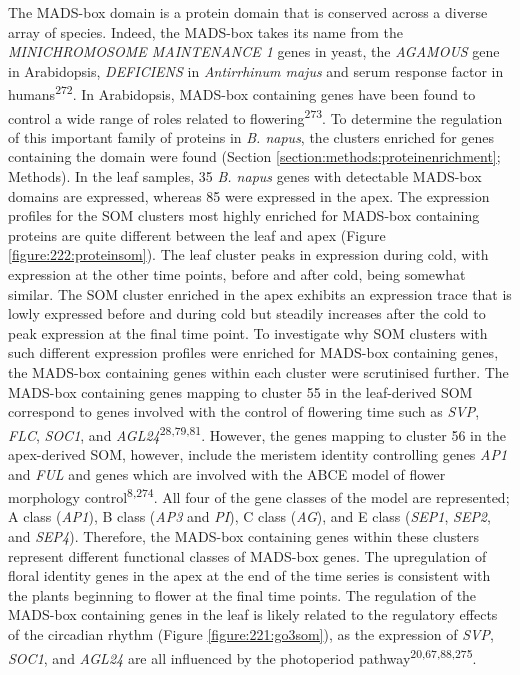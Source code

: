 \documentclass[12pt,]{book}
\begin{document}
The MADS-box domain is a protein domain that is conserved across a
diverse array of species. Indeed, the MADS-box takes its name from the
\emph{MINICHROMOSOME MAINTENANCE 1} genes in yeast, the \emph{AGAMOUS}
gene in Arabidopsis, \emph{DEFICIENS} in \emph{Antirrhinum majus} and
serum response factor in humans\textsuperscript{272}. In Arabidopsis,
MADS-box containing genes have been found to control a wide range of
roles related to flowering\textsuperscript{273}. To determine the
regulation of this important family of proteins in \emph{B. napus}, the
clusters enriched for genes containing the domain were found (Section
\ref{section:methods:proteinenrichment}; Methods). In the leaf samples,
35 \emph{B. napus} genes with detectable MADS-box domains are expressed,
whereas 85 were expressed in the apex. The expression profiles for the
SOM clusters most highly enriched for MADS-box containing proteins are
quite different between the leaf and apex (Figure
\ref{figure:222:proteinsom}). The leaf cluster peaks in expression
during cold, with expression at the other time points, before and after
cold, being somewhat similar. The SOM cluster enriched in the apex
exhibits an expression trace that is lowly expressed before and during
cold but steadily increases after the cold to peak expression at the
final time point. To investigate why SOM clusters with such different
expression profiles were enriched for MADS-box containing genes, the
MADS-box containing genes within each cluster were scrutinised further.
The MADS-box containing genes mapping to cluster 55 in the leaf-derived
SOM correspond to genes involved with the control of flowering time such
as \emph{SVP}, \emph{FLC}, \emph{SOC1}, and
\emph{AGL24}\textsuperscript{28,79,81}. However, the genes mapping to
cluster 56 in the apex-derived SOM, however, include the meristem
identity controlling genes \emph{AP1} and \emph{FUL} and genes which are
involved with the ABCE model of flower morphology
control\textsuperscript{8,274}. All four of the gene classes of the
model are represented; A class (\emph{AP1}), B class (\emph{AP3} and
\emph{PI}), C class (\emph{AG}), and E class (\emph{SEP1}, \emph{SEP2},
and \emph{SEP4}). Therefore, the MADS-box containing genes within these
clusters represent different functional classes of MADS-box genes. The
upregulation of floral identity genes in the apex at the end of the time
series is consistent with the plants beginning to flower at the final
time points. The regulation of the MADS-box containing genes in the leaf
is likely related to the regulatory effects of the circadian rhythm
(Figure \ref{figure:221:go3som}), as the expression of \emph{SVP},
\emph{SOC1}, and \emph{AGL24} are all influenced by the photoperiod
pathway\textsuperscript{20,67,88,275}.
\end{document}
